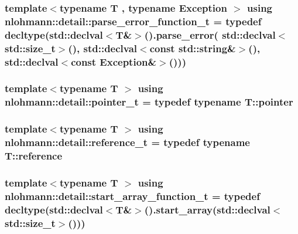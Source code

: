 \subsubsection[{\texorpdfstring{parse\+\_\+error\+\_\+function\+\_\+t}{parse_error_function_t}}]{\setlength{\rightskip}{0pt plus 5cm}template$<$typename T , typename Exception $>$ using {\bf nlohmann\+::detail\+::parse\+\_\+error\+\_\+function\+\_\+t} = typedef decltype(std\+::declval$<$T\&$>$().{\bf parse\+\_\+error}( std\+::declval$<$std\+::size\+\_\+t$>$(), std\+::declval$<$const {\bf std\+::string}\&$>$(), std\+::declval$<$const Exception\&$>$()))}\hypertarget{namespacenlohmann_1_1detail_a264d4d58bc1fd82bcc7bf6bf73d6acad}{}\label{namespacenlohmann_1_1detail_a264d4d58bc1fd82bcc7bf6bf73d6acad}
\subsubsection[{\texorpdfstring{pointer\+\_\+t}{pointer_t}}]{\setlength{\rightskip}{0pt plus 5cm}template$<$typename T $>$ using {\bf nlohmann\+::detail\+::pointer\+\_\+t} = typedef typename T\+::pointer}\hypertarget{namespacenlohmann_1_1detail_a26dc71e2dd9336587e56062178f9abce}{}\label{namespacenlohmann_1_1detail_a26dc71e2dd9336587e56062178f9abce}
\subsubsection[{\texorpdfstring{reference\+\_\+t}{reference_t}}]{\setlength{\rightskip}{0pt plus 5cm}template$<$typename T $>$ using {\bf nlohmann\+::detail\+::reference\+\_\+t} = typedef typename T\+::reference}\hypertarget{namespacenlohmann_1_1detail_a082bdafd3b4c61d9d1e92b35b8f75ee3}{}\label{namespacenlohmann_1_1detail_a082bdafd3b4c61d9d1e92b35b8f75ee3}
\subsubsection[{\texorpdfstring{start\+\_\+array\+\_\+function\+\_\+t}{start_array_function_t}}]{\setlength{\rightskip}{0pt plus 5cm}template$<$typename T $>$ using {\bf nlohmann\+::detail\+::start\+\_\+array\+\_\+function\+\_\+t} = typedef decltype(std\+::declval$<$T\&$>$().start\+\_\+array(std\+::declval$<$std\+::size\+\_\+t$>$()))}\hypertarget{namespacenlohmann_1_1detail_a80273cecc45765d7b2826ec931fbffdd}{}\label{namespacenlohmann_1_1detail_a80273cecc45765d7b2826ec931fbffdd}
